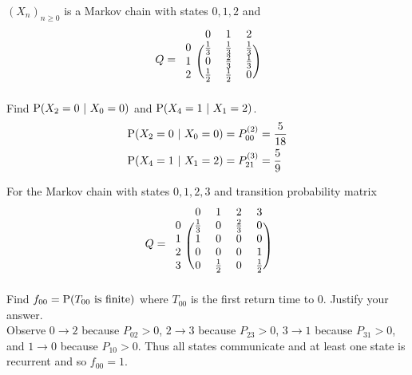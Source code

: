 \documentclass[12pt]{article}
\begin{document}
\begin{question} $(X_n)_{n\geq0}$ is a Markov chain with states $0,1,2$ and $$ Q =  \begin{blockarray}{cccc}
&0&1&2 \\
\begin{block}{c(ccc)}
0 & \frac{1}{3} & \frac{1}{3} & \frac{1}{3}  \\
1 & 0 & \frac{2}{3} & \frac{1}{3}  \\ 
2 & \frac{1}{2} & \frac{1}{2} & 0  \\  \end{block} \end{blockarray} $$
Find $\mathrm{P}( X_2 = 0 ~|~ X_0 = 0 )$ and $\mathrm{P}( X_4 = 1 ~|~ X_1 = 2 )$. 
$$ \begin{aligned} \mathrm{P}( X_2 = 0 ~|~ X_0=0 ) &= P_{00}^{(2)} = \frac{5}{18} \\ \mathrm{P}( X_4 = 1~|~X_1 = 2 ) &= P_{21}^{(3)} = \frac{5}{9} \end{aligned} $$ 

\end{question} 

\begin{question} For the Markov chain with states $0,1,2,3$ and transition probability matrix $$ Q =  \begin{blockarray}{ccccc}
&0&1&2&3 \\
\begin{block}{c(cccc)}
0 & \frac{1}{3} & 0 & \frac{2}{3} & 0  \\
1 & 1 & 0 & 0 & 0 \\ 
2 & 0 & 0 & 0 & 1 \\ 
3 & 0 & \frac{1}{2} & 0 & \frac{1}{2}  \\  \end{block} \end{blockarray} $$
Find $f_{00} = \mathrm{P}( T_{00} \text{ is finite} )$ where $T_{00}$ is the first return time to $0$. Justify your answer.  \\
Observe $0 \to 2$ because $P_{02} > 0$, $2 \to 3$ because $P_{23} > 0$, $3\to1$ because $P_{31} > 0$, and $1 \to 0$ because $P_{10} > 0$. Thus all states communicate and at least one state is recurrent and so $f_{00} = 1$. 
\end{question} 
\end{document}

